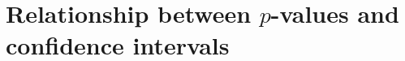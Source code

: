 \documentclass[]{book}\usepackage[]{graphicx}\usepackage[]{color}
\begin{document}
\section{Relationship between $p$-values and confidence intervals}
%
%
%
\end{document}

